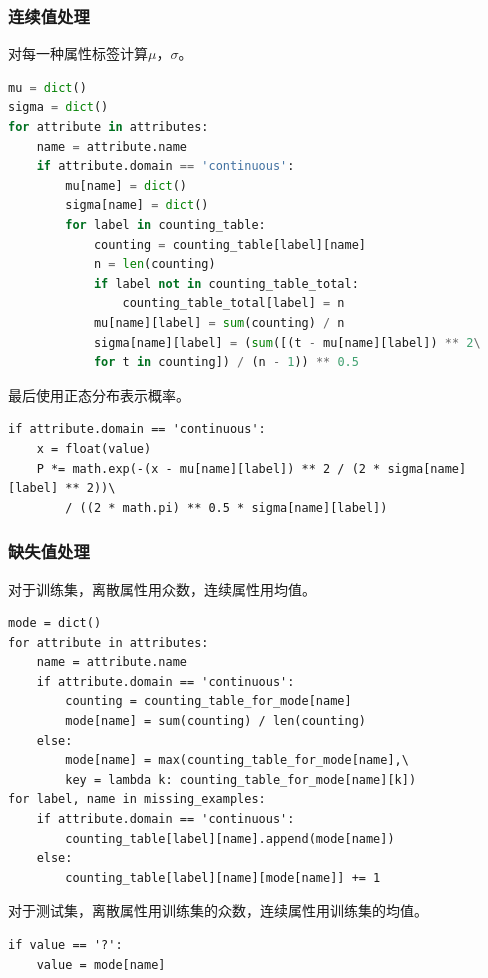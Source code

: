 \documentclass[a4paper, 11pt]{article}
\begin{document}
\subsubsection{连续值处理}
对每一种属性标签计算$\mu$，$\sigma$。
\begin{lstlisting}[language=python]
mu = dict()
sigma = dict()
for attribute in attributes:
	name = attribute.name
	if attribute.domain == 'continuous':
		mu[name] = dict()
		sigma[name] = dict()
		for label in counting_table:
			counting = counting_table[label][name]
			n = len(counting)
			if label not in counting_table_total:
				counting_table_total[label] = n
			mu[name][label] = sum(counting) / n
			sigma[name][label] = (sum([(t - mu[name][label]) ** 2\
			for t in counting]) / (n - 1)) ** 0.5
\end{lstlisting}
最后使用正态分布表示概率。
\begin{lstlisting}
if attribute.domain == 'continuous':
	x = float(value)
	P *= math.exp(-(x - mu[name][label]) ** 2 / (2 * sigma[name][label] ** 2))\
		/ ((2 * math.pi) ** 0.5 * sigma[name][label])
\end{lstlisting}
\subsubsection{缺失值处理}
对于训练集，离散属性用众数，连续属性用均值。
\begin{lstlisting}
mode = dict()
for attribute in attributes:
	name = attribute.name
	if attribute.domain == 'continuous':
		counting = counting_table_for_mode[name]
		mode[name] = sum(counting) / len(counting)
	else:
		mode[name] = max(counting_table_for_mode[name],\
		key = lambda k: counting_table_for_mode[name][k])
for label, name in missing_examples:
	if attribute.domain == 'continuous':
		counting_table[label][name].append(mode[name])
	else:
		counting_table[label][name][mode[name]] += 1
\end{lstlisting}
对于测试集，离散属性用训练集的众数，连续属性用训练集的均值。
\begin{lstlisting}
if value == '?':
	value = mode[name]
\end{lstlisting}
\end{document}
